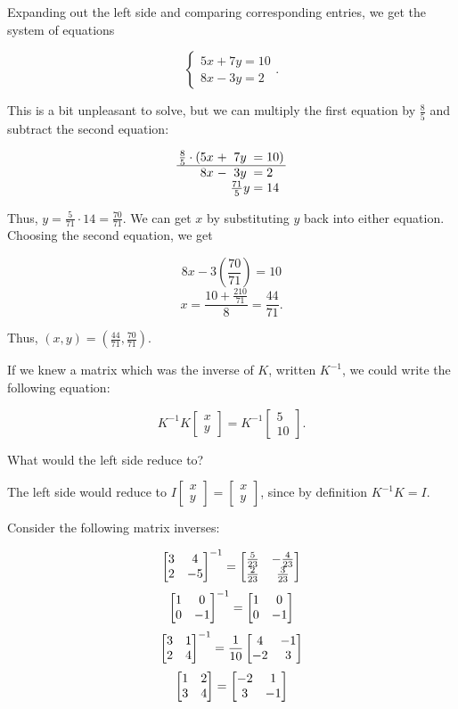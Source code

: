 \documentclass[../gatm_answers.tex]{subfiles}
\begin{document}
Expanding out the left side and comparing corresponding entries, we get the system of equations

$$\begin{cases} 5x+7y = 10 \\ 8x-3y =2 \end{cases}.$$

This is a bit unpleasant to solve, but we can multiply the first equation by $\frac{8}{5}$ and subtract the second equation:

$$\arraycolsep=1.4pt\begin{array}{rcccl}
\frac{8}{5}\cdot (5x & + & 7y & = & 10) \\ \hline
8x & - & 3y & = & 2 \\
& & \frac{71}{5}y & = & 14 \\
\end{array}$$

Thus, $y=\frac{5}{71}\cdot 14 = \frac{70}{71}$. We can get $x$ by substituting $y$ back into either equation. Choosing the second equation, we get

$$8x-3\left(\frac{70}{71}\right)=10$$
$$x = \frac{10 + \frac{210}{71}}{8} = \frac{44}{71}.$$

Thus, $(x,y)=\left(\frac{44}{71},\frac{70}{71}\right)$.

\begin{inner_problem}
\item If we knew a matrix which was the inverse of $K$, written $K^{-1}$, we could write the following equation:

$$K^{-1}K\left[\begin{array}{c} x \\ y \end{array}\right]=K^{-1}\left[\begin{array}{c} 5 \\ 10 \end{array}\right].$$

What would the left side reduce to?
\end{inner_problem}

The left side would reduce to $I\left[\begin{array}{c} x \\ y \end{array}\right]=\left[\begin{array}{c} x \\ y \end{array}\right]$, since by definition $K^{-1}K=I$.

\begin{outer_problem}
\item Consider the following matrix inverses:

$$\begin{bmatrix} 3 & 4 \\ 2 & -5 \end{bmatrix}^{-1}=\begin{bmatrix} \frac{5}{23} & -\frac{4}{23} \\ \frac{2}{23} & \frac{3}{23} \end{bmatrix}$$
$$\begin{bmatrix} 1 & 0 \\ 0 & -1 \end{bmatrix}^{-1}=\begin{bmatrix} 1 & 0 \\ 0 & -1 \end{bmatrix}$$
$$\begin{bmatrix} 3 & 1 \\ 2 & 4 \end{bmatrix}^{-1}=\frac{1}{10}\begin{bmatrix} 4 & -1 \\ -2 & 3 \end{bmatrix}$$
$$\begin{bmatrix} 1 & 2 \\ 3 & 4 \end{bmatrix} = \begin{bmatrix} -2 & 1 \\ 3 & -1 \end{bmatrix}$$
\end{outer_problem}
\end{document}

